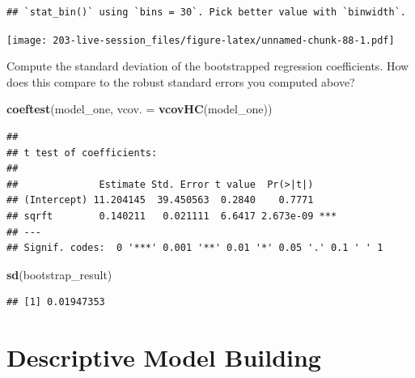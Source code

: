 \documentclass[
]{book}
\newenvironment{Shaded}{\begin{snugshade}}{\end{snugshade}}
\newcommand{\AttributeTok}[1]{\textcolor[rgb]{0.13,0.29,0.53}{#1}}
\newcommand{\FunctionTok}[1]{\textcolor[rgb]{0.13,0.29,0.53}{\textbf{#1}}}
\newcommand{\NormalTok}[1]{#1}
\theoremstyle{definition}
\theoremstyle{definition}
\theoremstyle{definition}
\theoremstyle{definition}
\theoremstyle{remark}
\begin{document}
\begin{verbatim}
## `stat_bin()` using `bins = 30`. Pick better value with `binwidth`.
\end{verbatim}

\texttt{[image: 203-live-session\_files/figure-latex/unnamed-chunk-88-1.pdf]}

Compute the standard deviation of the bootstrapped regression coefficients. How does this compare to the robust standard errors you computed above?

\begin{Shaded}
\begin{Highlighting}[]
\FunctionTok{coeftest}\NormalTok{(model\_one, }\AttributeTok{vcov. =} \FunctionTok{vcovHC}\NormalTok{(model\_one))}
\end{Highlighting}
\end{Shaded}

\begin{verbatim}
## 
## t test of coefficients:
## 
##              Estimate Std. Error t value  Pr(>|t|)    
## (Intercept) 11.204145  39.450563  0.2840    0.7771    
## sqrft        0.140211   0.021111  6.6417 2.673e-09 ***
## ---
## Signif. codes:  0 '***' 0.001 '**' 0.01 '*' 0.05 '.' 0.1 ' ' 1
\end{verbatim}

\begin{Shaded}
\begin{Highlighting}[]
\FunctionTok{sd}\NormalTok{(bootstrap\_result)}
\end{Highlighting}
\end{Shaded}

\begin{verbatim}
## [1] 0.01947353
\end{verbatim}

\hypertarget{descriptive-model-building}{%
\chapter{Descriptive Model Building}\label{descriptive-model-building}}
\end{document}
